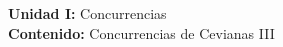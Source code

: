 {\Large
    \textbf{Unidad I:} Concurrencias\vspace{2mm}\\
    \textbf{Contenido:} Concurrencias de Cevianas III
}